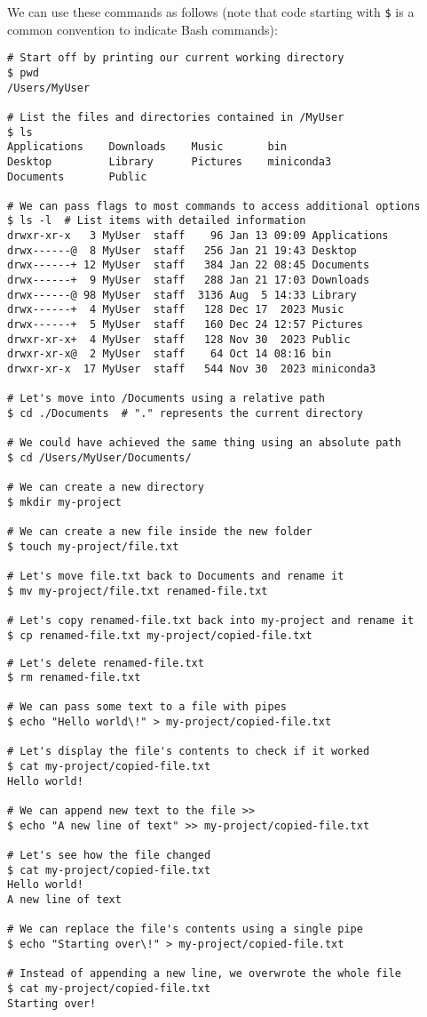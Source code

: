 \documentclass[12pt]{article}
\begin{document}
\pagebreak
We can use these commands as follows (note that code starting with
\texttt{\$} is a common convention to indicate Bash commands):

\begin{verbatim}
# Start off by printing our current working directory
$ pwd
/Users/MyUser

# List the files and directories contained in /MyUser
$ ls
Applications    Downloads    Music       bin
Desktop         Library      Pictures    miniconda3
Documents       Public

# We can pass flags to most commands to access additional options
$ ls -l  # List items with detailed information
drwxr-xr-x   3 MyUser  staff    96 Jan 13 09:09 Applications
drwx------@  8 MyUser  staff   256 Jan 21 19:43 Desktop
drwx------+ 12 MyUser  staff   384 Jan 22 08:45 Documents
drwx------+  9 MyUser  staff   288 Jan 21 17:03 Downloads
drwx------@ 98 MyUser  staff  3136 Aug  5 14:33 Library
drwx------+  4 MyUser  staff   128 Dec 17  2023 Music
drwx------+  5 MyUser  staff   160 Dec 24 12:57 Pictures
drwxr-xr-x+  4 MyUser  staff   128 Nov 30  2023 Public
drwxr-xr-x@  2 MyUser  staff    64 Oct 14 08:16 bin
drwxr-xr-x  17 MyUser  staff   544 Nov 30  2023 miniconda3

# Let's move into /Documents using a relative path
$ cd ./Documents  # "." represents the current directory

# We could have achieved the same thing using an absolute path
$ cd /Users/MyUser/Documents/

# We can create a new directory
$ mkdir my-project

# We can create a new file inside the new folder
$ touch my-project/file.txt

# Let's move file.txt back to Documents and rename it
$ mv my-project/file.txt renamed-file.txt

# Let's copy renamed-file.txt back into my-project and rename it
$ cp renamed-file.txt my-project/copied-file.txt
\end{verbatim}

\pagebreak
\begin{verbatim}
# Let's delete renamed-file.txt
$ rm renamed-file.txt

# We can pass some text to a file with pipes
$ echo "Hello world\!" > my-project/copied-file.txt

# Let's display the file's contents to check if it worked
$ cat my-project/copied-file.txt
Hello world!

# We can append new text to the file >>
$ echo "A new line of text" >> my-project/copied-file.txt

# Let's see how the file changed
$ cat my-project/copied-file.txt
Hello world!
A new line of text

# We can replace the file's contents using a single pipe
$ echo "Starting over\!" > my-project/copied-file.txt

# Instead of appending a new line, we overwrote the whole file
$ cat my-project/copied-file.txt
Starting over!
\end{verbatim}
\end{document}
